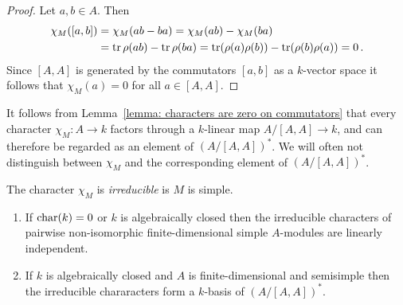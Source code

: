 \begin{proof}
  Let $a, b \in A$.
  Then
  \begin{align*}
        \chi_M([a,b])
    &=  \chi_M(ab - ba)
     =  \chi_M(ab) - \chi_M(ba) \\
    &=  \operatorname{tr} \rho(ab) - \operatorname{tr} \rho(ba)
     =  \operatorname{tr}( \rho(a) \rho(b) ) - \operatorname{tr}( \rho(b) \rho(a) )
     =  0 \,.
  \end{align*}
  Since $[A,A]$ is generated by the commutators $[a,b]$ as a $k$-vector space it follows that $\chi_M(a) = 0$ for all $a \in [A,A]$.
\end{proof}


\begin{fluff}
  It follows from Lemma~\ref{lemma: characters are zero on commutators} that every character $\chi_M \colon A \to k$ factors through a $k$-linear map $A/[A,A] \to k$, and can therefore be regarded as an element of $(A/[A,A])^*$.
  We will often not distinguish between $\chi_M$ and the corresponding element of $(A/[A,A])^*$.
\end{fluff}


\begin{definition}
  The character $\chi_M$ is \emph{irreducible} is $M$ is simple.
\end{definition}


\begin{theorem}
  \leavevmode
  \label{theorem: characters as a basis}
  \begin{enumerate}
    \item
      \label{enumerate: characters are linearly independent}
      If $\operatorname{char}(k) = 0$ or $k$ is algebraically closed then the irreducible characters of pairwise non-isomorphic finite-dimensional simple $A$-modules are linearly independent.
    \item
      If $k$ is algebraically closed and $A$ is finite-dimensional and semisimple then the irreducible chararacters form a $k$-basis of $(A/[A,A])^*$.
  \end{enumerate}
\end{theorem}


